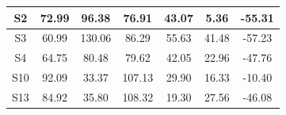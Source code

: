 \begin{table}[hp]
\begin{tabular}{ccccccc}
    \multicolumn{1}{|c|}{S2}                                                          & \multicolumn{1}{c|}{72.99}                                      & \multicolumn{1}{c|}{96.38}                                   & \multicolumn{1}{c|}{76.91}                                    & \multicolumn{1}{c|}{43.07}                                    & \multicolumn{1}{c|}{5.36}                                     & \multicolumn{1}{c|}{-55.31}                                    \\ \hline
    \multicolumn{1}{|c|}{S3}                                                          & \multicolumn{1}{c|}{60.99}                                      & \multicolumn{1}{c|}{130.06}                                  & \multicolumn{1}{c|}{86.29}                                    & \multicolumn{1}{c|}{55.63}                                    & \multicolumn{1}{c|}{41.48}                                    & \multicolumn{1}{c|}{-57.23}                                    \\ \hline
    \multicolumn{1}{|c|}{S4}                                                          & \multicolumn{1}{c|}{64.75}                                      & \multicolumn{1}{c|}{80.48}                                   & \multicolumn{1}{c|}{79.62}                                    & \multicolumn{1}{c|}{42.05}                                    & \multicolumn{1}{c|}{22.96}                                    & \multicolumn{1}{c|}{-47.76}                                    \\ \hline
    \multicolumn{1}{|c|}{S10}                                                         & \multicolumn{1}{c|}{92.09}                                      & \multicolumn{1}{c|}{33.37}                                   & \multicolumn{1}{c|}{107.13}                                   & \multicolumn{1}{c|}{29.90}                                    & \multicolumn{1}{c|}{16.33}                                    & \multicolumn{1}{c|}{-10.40}                                    \\ \hline
    \multicolumn{1}{|c|}{S13}                                                         & \multicolumn{1}{c|}{84.92}                                      & \multicolumn{1}{c|}{35.80}                                   & \multicolumn{1}{c|}{108.32}                                   & \multicolumn{1}{c|}{19.30}                                    & \multicolumn{1}{c|}{27.56}                                    & \multicolumn{1}{c|}{-46.08}                                    \\ \hline

\end{tabular}
\end{table}
